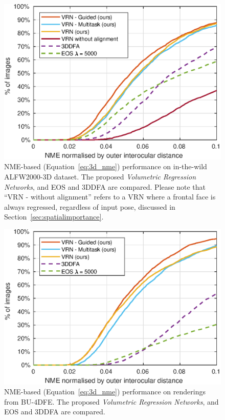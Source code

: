 \begin{figure}
  \centering
  \includegraphics[width=0.75\linewidth]{curves/aflw.eps}
  \caption[NME performance on AFLW2000-3D images]{NME-based
    (Equation~\ref{eq:3d_nme}) performance on in-the-wild ALFW2000-3D
    dataset. The proposed \textit{Volumetric Regression Networks}, and
    EOS and 3DDFA are compared. Please note that ``VRN - without
    alignment'' refers to a VRN where a frontal face is always
    regressed, regardless of input pose, discussed in
    Section~\ref{sec:spatialimportance}.}
  \label{roc:aflw2000}
\end{figure}

\begin{figure}
  \centering
  \includegraphics[width=0.75\linewidth]{curves/bu4dfe.eps}
  \caption[NME performance on BU-4DFE renderings]{NME-based
    (Equation~\ref{eq:3d_nme}) performance on renderings from
    BU-4DFE. The proposed \textit{Volumetric Regression Networks}, and
    EOS and 3DDFA are compared.}
  \label{roc:bu4dfe}
\end{figure}

